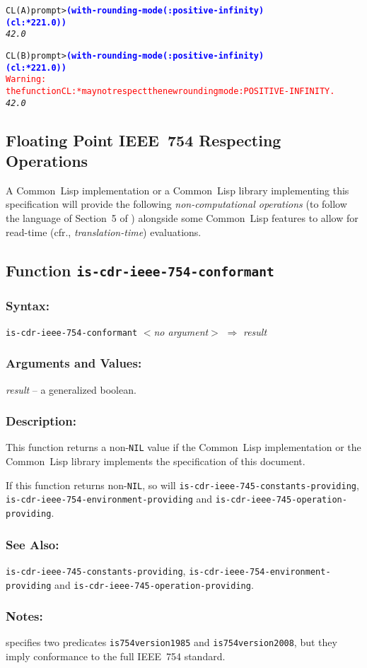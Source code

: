 \documentclass[10pt,fleqn]{article}
\newcommand{\CL}{\textsf{Common~Lisp}}
\newcommand{\code}[1]{\texttt{#1}}
\newcommand{\varname}[1]{\textit{#1}}
\newcommand{\codeprompt}[1]{\textcolor{blue}{\textbf{#1}}}
\newcommand{\DDictionaryItem}[1]{\vspace*{6pt}\noindent\hrulefill\vspace*{-9pt}\subsection*{#1}}
\newcommand{\DSyntax}{\subsubsection*{Syntax:}}
\newcommand{\DArgsNValues}{\subsubsection*{Arguments and Values:}}
\newcommand{\DDescription}{\subsubsection*{Description:}}
\newcommand{\DNotes}{\subsubsection*{Notes:}}
\newcommand{\DSeeAlso}{\subsubsection*{See Also:}}
\begin{document}
\begin{alltt}
CL(A) prompt> \codeprompt{(with-rounding-mode (:positive-infinity)
                  (cl:* 2 21.0))}
\textit{42.0}
\end{alltt}

\begin{alltt}
CL(B) prompt> \codeprompt{(with-rounding-mode (:positive-infinity)
                  (cl:* 2 21.0))}
\textcolor{red}{Warning:
the function CL:* may not respect the new rounding mode :POSITIVE-INFINITY.}
\textit{42.0}
\end{alltt}



\subsection{Floating Point IEEE~754 Respecting Operations}
\label{sect:fp-operations}

A \CL{} implementation or a \CL{} library implementing this
specification will provide the following \emph{non-computational
  operations} (to follow the language of Section~5 of \cite{IEEE-754})
alongside some \CL{} features to allow for read-time (cfr.,
\emph{translation-time}) evaluations.


\DDictionaryItem{Function \code{is-cdr-ieee-754-conformant}}

\DSyntax{}

\code{is-cdr-ieee-754-conformant} \varname{$<$no argument$>$}
$\Rightarrow$ \varname{result}

\DArgsNValues{}

\varname{result} -- a generalized boolean.

\DDescription{}

This function returns a non-\code{NIL} value if the \CL{}
implementation or the \CL{} library implements the specification of
this document.

If this function returns non-\code{NIL}, so will
\code{is-cdr-ieee-745-constants-providing},
\code{is-cdr-ieee-754-environment-providing} and
\code{is-cdr-ieee-745-operation-providing}.

\DSeeAlso{}

\code{is-cdr-ieee-745-constants-providing},
\code{is-cdr-ieee-754-environment-providing} and
\code{is-cdr-ieee-745-operation-providing}.



\DNotes{}

\cite{IEEE-754} specifies two predicates \code{is754version1985} and
\code{is754version2008}, but they imply conformance to the full
IEEE~754 standard.
\end{document}
